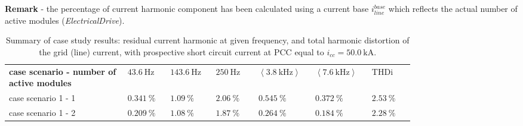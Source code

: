 \documentclass[12pt,a4paper]{scrartcl}
\begin{document}
\begin{onehalfspace}
\noindent\textbf{Remark} - the percentage of current harmonic component has been calculated using a current base $i_{line}^{base}$ which reflects the actual number of active modules (\textit{ElectricalDrive}).


 \begin{center}	
	\onehalfspacing
	\begin{longtable}{p{0.25\linewidth}|p{0.09\linewidth}|p{0.09\linewidth}|p{0.09\linewidth}|p{0.09\linewidth}|p{0.09\linewidth}|p{0.09\linewidth}}
		\captionsetup{width=0.65\textwidth, font=small}
		\caption{Summary of case study results: residual current harmonic at given frequency, and total harmonic distortion of the grid (line) current, with prospective short circuit current at PCC equal to $i_{cc}=\SI{50.0}{\kilo\ampere}$.}
		\label{summary_results_table_1} \\
		\hline\hline
		\textbf{case scenario - number of active modules} & \hspace*{\fill} $\SI{43.6}{\hertz}$  & \hspace*{\fill} $\SI{143.6}{\hertz}$  & \hspace*{\fill} $\SI{250}{\hertz}$ & \hspace*{\fill} $\left\langle\SI{3.8}{\kilo\hertz}\right\rangle$ & \hspace*{\fill} $\left\langle\SI{7.6}{\kilo\hertz}\right\rangle$ & \hspace*{\fill} THDi \\
		\hline
		case scenario 1 - 1 & \hspace*{\fill} $\SI{0.341}{\percent}$ & \hspace*{\fill} $\SI{1.09}{\percent}$ & \hspace*{\fill} $\SI{2.06}{\percent}$ & \hspace*{\fill} $\SI{0.545}{\percent}$ & \hspace*{\fill} $\SI{0.372}{\percent}$ & \hspace*{\fill} $\SI{2.53}{\percent}$\\		
		case scenario 1 - 2 & \hspace*{\fill} $\SI{0.209}{\percent}$ & \hspace*{\fill} $\SI{1.08}{\percent}$ & \hspace*{\fill} $\SI{1.87}{\percent}$ & \hspace*{\fill} $\SI{0.264}{\percent}$ & \hspace*{\fill} $\SI{0.184}{\percent}$ & \hspace*{\fill} $\SI{2.28}{\percent}$\\	

\end{longtable}
\end{center}
\end{onehalfspace}
\end{document}
